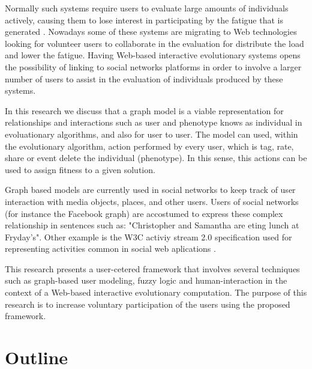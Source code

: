 \par Normally such systems require users to evaluate large amounts of
individuals actively, causing them to lose interest in participating by the
fatigue that is generated \cite{takagi2001interactive}. Nowadays some of these
systems are migrating to Web technologies looking for volunteer users to
collaborate in the evaluation for distribute the load and lower the fatigue.
Having Web-based interactive evolutionary systems opens the possibility of
linking to social networks platforms in order to involve a larger number of
users to assist in the evaluation of individuals produced by these systems.

\par In this research we discuss that a graph model is a viable representation for
relationships and interactions such as user and phenotype knows as individual in
evoluationary algorithms, and also for user to user. The model can used, within
the evolutionary algorithm, action performed by every user, which is tag, rate,
share or event delete the individual (phenotype). In this sense, this actions
can be used to assign fitness to a given solution.

\par Graph based models are currently used in social networks to keep track of
user interaction with media objects, places, and other users. Users of social
networks (for instance the Facebook graph) are accostumed to express these
complex relationship in sentences such as: "Christopher and Samantha are eting
lunch at Fryday's". Other example is the W3C activiy stream 2.0 specification
used for representing activities common in social web aplications
\cite{snell2014json}.

\par This research presents a user-cetered framework that involves several
techniques such as graph-based user modeling, fuzzy logic and human-interaction
in the context of a Web-based interactive evolutionary computation. The purpose
of this research is to increase voluntary participation of the users  using the
proposed framework.

\section{Outline}

